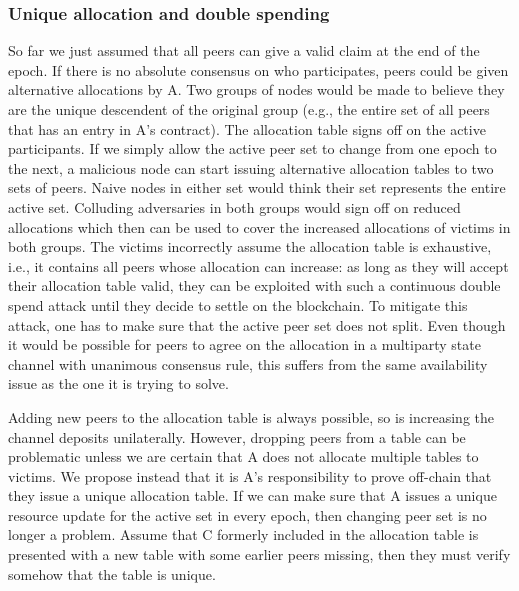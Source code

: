 \subsubsection{Unique allocation and double spending}

So far we just assumed that all peers can give a valid claim at the end of the epoch. 
If there is no absolute consensus on who participates, peers could be given alternative allocations by A. Two groups of nodes would be made to believe they are the unique descendent of the original group (e.g., the entire set of all peers that has an entry in A's contract). The allocation table signs off on the active participants.
If we simply allow the active peer set to change from one epoch to the next, a malicious node can start issuing alternative allocation tables to two sets of peers. Naive nodes in either set would think their set represents the entire active set. Colluding adversaries in both groups would sign off on reduced allocations which then can be used to cover the increased allocations of victims in both groups. The victims incorrectly assume the allocation table is exhaustive, i.e., it contains all peers whose allocation can increase: as long as they will accept their allocation table valid, they can be exploited with such a continuous double spend attack until they decide to settle on the blockchain. To mitigate this attack, one has to make sure that the active peer set does not split. Even though it would be possible for peers to agree on the allocation in a multiparty state channel with unanimous consensus rule, this suffers from the same availability issue as the one it is trying to solve.

Adding new peers to the allocation table is always possible, so is increasing the channel deposits unilaterally. However, dropping peers from a table can be problematic unless we are certain that A does not allocate multiple tables to victims.
We propose instead that it is A's responsibility to prove off-chain that they issue a unique allocation table. 
If we can make sure that A issues a unique resource update for the active set in every epoch, then changing peer set is no longer a problem. 
Assume that C formerly included in the allocation table is presented with a new table with some earlier peers missing, then they must verify somehow that the table is unique. 

